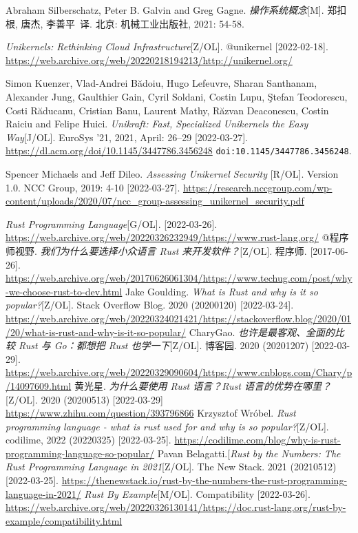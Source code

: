 \documentclass[UTF8,fontset=none,linespread=1.15]{ctexart}
\begin{document}
\begin{thebibliography}{99}
 Abraham Silberschatz, Peter B. Galvin and Greg Gagne.
\textit{操作系统概念}[M]. 郑扣根, 唐杰, 李善平\ 译. 北京: 机械工业出版社, 2021: 54-58.

\textit{Unikernels: Rethinking Cloud Infrastructure}[Z/OL].
@unikernel [2022-02-18]. \url{https://web.archive.org/web/20220218194213/http://unikernel.org/}

 Simon Kuenzer, Vlad-Andrei Bădoiu, Hugo Lefeuvre, Sharan Santhanam,
Alexander Jung, Gaulthier Gain, Cyril Soldani, Costin Lupu, \c{S}tefan Teodorescu, Costi Răducanu,
Cristian Banu, Laurent Mathy, Răzvan Deaconescu, Costin Raiciu and Felipe Huici.
\textit{Unikraft: Fast, Specialized Unikernels the Easy Way}[J/OL]. EuroSys '21, 2021, April: 26–29
[2022-03-27]. \url{https://dl.acm.org/doi/10.1145/3447786.3456248} \texttt{doi:10.1145/3447786.3456248}.

 Spencer Michaels and Jeff Dileo. \textit{Assessing Unikernel Security
}[R/OL]. Version 1.0. NCC Group, 2019: 4-10 [2022-03-27].
\url{https://research.nccgroup.com/wp-content/uploads/2020/07/ncc_group-assessing_unikernel_security.pdf}

 \textit{Rust Programming Language}[G/OL]. [2022-03-26]. \url{https://web.archive.org/web/20220326232949/https://www.rust-lang.org/}
 @程序师视野. \textit{我们为什么要选择小众语言 Rust 来开发软件？}[Z/OL]. 程序师. [2017-06-26]. \url{https://web.archive.org/web/20170626061304/https://www.techug.com/post/why-we-choose-rust-to-dev.html}
Jake Goulding. \textit{What is Rust and why is it so popular?}[Z/OL]. Stack Overflow Blog. 2020 (20200120) [2022-03-24]. \url{https://web.archive.org/web/20220324021421/https://stackoverflow.blog/2020/01/20/what-is-rust-and-why-is-it-so-popular/}
 CharyGao. \textit{也许是最客观、全面的比较 Rust 与 Go：都想把 Rust 也学一下}[Z/OL]. 博客园. 2020 (20201207) [2022-03-29]. \url{https://web.archive.org/web/20220329090604/https://www.cnblogs.com/Chary/p/14097609.html}
 黄光星. \textit{为什么要使用 Rust 语言？Rust 语言的优势在哪里？}[Z/OL].
2020 (20200513) [2022-03-29] \url{https://www.zhihu.com/question/393796866}
 Krzysztof Wróbel. \textit{Rust programming language - what is rust used for and why is so popular?}[Z/OL]. codilime, 2022 (20220325) [2022-03-25]. \url{https://codilime.com/blog/why-is-rust-programming-language-so-popular/}
 Pavan Belagatti.[\textit{Rust by the Numbers: The Rust Programming Language in 2021}[Z/OL]. The New Stack. 2021 (20210512) [2022-03-25]. \url{https://thenewstack.io/rust-by-the-numbers-the-rust-programming-language-in-2021/}
 \textit{Rust By Example}[M/OL]. Compatibility [2022-03-26]. \url{https://web.archive.org/web/20220326130141/https://doc.rust-lang.org/rust-by-example/compatibility.html}


\end{thebibliography}
\end{document}
